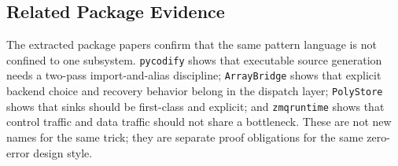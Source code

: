\subsection{Related Package Evidence}
The extracted package papers confirm that the same pattern language is not confined to one subsystem. \texttt{pycodify} shows that executable source generation needs a two-pass import-and-alias discipline; \texttt{ArrayBridge} shows that explicit backend choice and recovery behavior belong in the dispatch layer; \texttt{PolyStore} shows that sinks should be first-class and explicit; and \texttt{zmqruntime} shows that control traffic and data traffic should not share a bottleneck. These are not new names for the same trick; they are separate proof obligations for the same zero-error design style.
